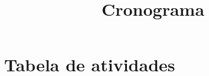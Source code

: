 \documentclass[a4paper, 11pt]{article} %
\title{\textbf{Cronograma}} %
\makeatletter
\renewcommand{\maketitle}{ %
\begin{center} %
{\LARGE\@title} %

\vspace{20pt} %

\end{center}
}
\makeatother
\begin{document}
\maketitle %


\section*{Tabela de atividades}

\begin{table}[h]
\begin{tabular}{|l|l|l|l|l|l|}


\end{tabular}
\end{table}
\end{document}

